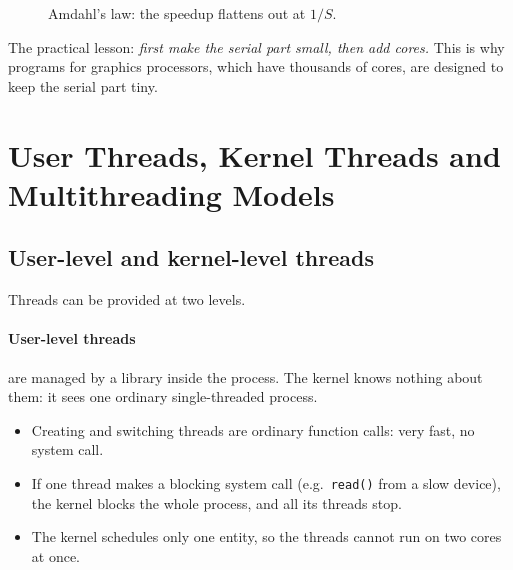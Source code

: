 \documentclass[11pt,a4paper]{article}
\newcommand{\cmd}[1]{\texttt{#1}}
\begin{document}
\begin{figure}[H]
\centering
{}
\caption{Amdahl's law: the speedup flattens out at $1/S$.}
\end{figure}

The practical lesson: \emph{first make the serial part small, then add cores.} This is why programs for graphics processors, which have thousands of cores, are designed to keep the serial part tiny.

\section{User Threads, Kernel Threads and Multithreading Models}

\subsection{User-level and kernel-level threads}

Threads can be provided at two levels.

\paragraph{User-level threads} are managed by a library inside the process. The kernel knows nothing about them: it sees one ordinary single-threaded process.
\begin{itemize}
  \item[\textcolor{mintdeep}{$+$}] Creating and switching threads are ordinary function calls: very fast, no system call.
  \item[\textcolor{red!60!black}{$-$}] If one thread makes a blocking system call (e.g.\ \cmd{read()} from a slow device), the kernel blocks the whole process, and all its threads stop.
  \item[\textcolor{red!60!black}{$-$}] The kernel schedules only one entity, so the threads cannot run on two cores at once.
\end{itemize}
\end{document}
